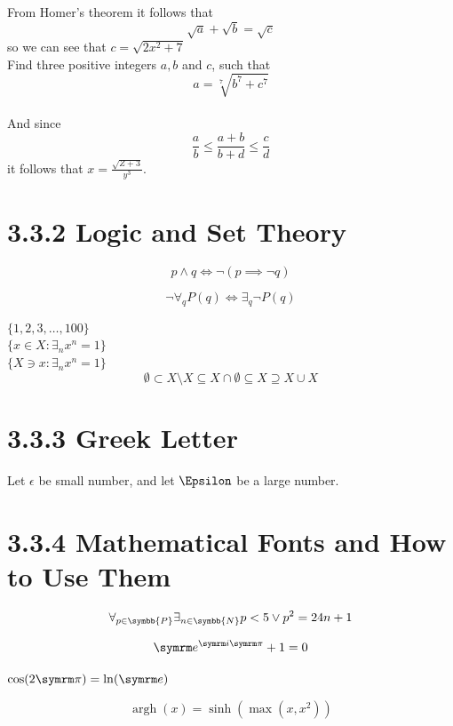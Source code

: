 \documentclass{article}
\DeclareMathOperator{\argh}{argh}
\begin{document}
From Homer's theorem it 
follows that
\[
  \sqrt{a} + \sqrt{b} = \sqrt{c}
\]
so we can see that 
\(c = \sqrt{2x^2+7}\)\\[0.5cm]

Find three positive integers 
\(a,b\) and \(c\), such that 
\[
a = \sqrt[7]{b^7 + c^7}
\]\\[0.5cm]

And since 
\[
\frac{a}{b} \leq
\frac{a+b}{b+d} \leq
\frac{c}{d}
\]
it follows that
\(x = \frac{\sqrt{Z+3}}{y^3}\).\\[0.5cm]

\section{3.3.2 Logic and Set Theory}

\[
p \land q \iff 
\lnot (p \implies \lnot q)
\]


\[
\lnot\forall_{q} P(q) \iff
\exists_{q}\lnot P(q)
\]

\(\{1, 2, 3, \ldots, 100\}\)\\[0.5cm]

\( \{ x \in X: \exists_n x^n = 1 \}  \)\\[0.5cm]
\( \{ X \ni x\colon \exists_n x^n = 1 \}  \)\\[0.5cm]

\RenewDocumentCommand{\setminus}{}{\smallsetminus}
\[
  \emptyset
  \subset X \setminus X 
  \subseteq X \cap \emptyset
  \subseteq X
  \supseteq X \cup X
\]

\section{3.3.3 Greek Letter}

Let \(\epsilon\) be small 
number, and let \(\Epsilon\)
be a large number.

\section{3.3.4 Mathematical Fonts and How to Use Them}

\[
\forall_{p \in \symbb{P}}
\exists_{n \in \symbb{N}}
p < 5 \lor p^2 = 24n +1
\]

\NewDocumentCommand{\cpi}{}{\symrm{\pi}}
\[
\e^{\im\cpi} + 1 = 0
\]

\( \cos(2\cpi) = \ln(\e) \)

\[
\argh(x) = \sinh(\max(x,x^2))
\]
\end{document}
